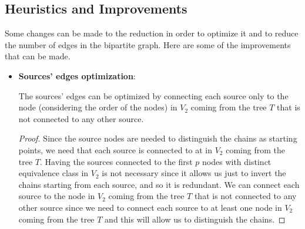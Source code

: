 \subsection{Heuristics and Improvements}
Some changes can be made to the reduction in order to optimize it and to reduce the number of edges in the bipartite graph. Here are some of the improvements that can be made.

\begin{itemize}
    \item \textbf{Sources' edges optimization}:
    \begin{lemma} \label{lemma:sources_optimization}
        The sources' edges can be optimized by connecting each source only to the   node (considering the order of the nodes) in $V_2$ coming from the tree $T$ that is not connected to any other source.
    \end{lemma}
    

    \begin{proof}
        Since the source nodes are needed to distinguish the chains as starting points, we need that each source is connected to at   in $V_2$ coming from the tree $T$. Having the sources connected to the first $p$ nodes with distinct equivalence class in $V_2$ is not necessary since it allows us just to invert the chains starting from each source, and so it is redundant. We can connect each source to the  node in $V_2$ coming from the tree $T$ that is not connected to any other source since we need to connect each source to at least one node in $V_2$ coming from the tree $T$ and this will allow us to distinguish the chains.
    \end{proof}


\end{itemize}
